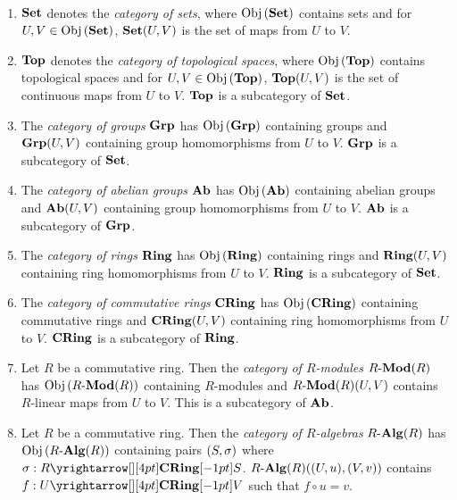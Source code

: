 \begin{eg}~
  \begin{enumerate}
    \item $\mathbf{Set}$ denotes the \emph{category of sets}, where 
    $\mathrm{Obj}\left(\mathbf{Set}\right)$ contains sets and for $U, V \in \mathrm{Obj}\left(\mathbf{Set}\right)$, 
    $\mathbf{Set}(U,V)$ is the set of maps from $U$ to $V$. 
    \item $\mathbf{Top}$ denotes the \emph{category of topological spaces}, where
    $\mathrm{Obj}\left(\mathbf{Top}\right)$ contains topological spaces and for $U, V \in \mathrm{Obj}\left(\mathbf{Top}\right)$, 
    $\mathbf{Top}(U,V)$ is the set of continuous maps from $U$ to $V$. 
    $\mathbf{Top}$ is a subcategory of $\mathbf{Set}$. 
    \item The \emph{category of groups} $\mathbf{Grp}$ has 
    $\mathrm{Obj}\left(\mathbf{Grp}\right)$ containing groups and 
    $\mathbf{Grp}(U,V)$ containing group homomorphisms from $U$ to $V$. 
    $\mathbf{Grp}$ is a subcategory of $\mathbf{Set}$.  
    \item The \emph{category of abelian groups} $\mathbf{Ab}$ has 
    $\mathrm{Obj}\left(\mathbf{Ab}\right)$ containing abelian groups and 
    $\mathbf{Ab}(U,V)$ containing group homomorphisms from $U$ to $V$. 
    $\mathbf{Ab}$ is a subcategory of $\mathbf{Grp}$. 
    \item The \emph{category of rings} $\mathbf{Ring}$ has 
    $\mathrm{Obj}\left(\mathbf{Ring}\right)$ containing rings and 
    $\mathbf{Ring}(U,V)$ containing ring homomorphisms from $U$ to $V$.
    $\mathbf{Ring}$ is a subcategory of $\mathbf{Set}$. 
    \item The \emph{category of commutative rings} $\mathbf{CRing}$ has 
    $\mathrm{Obj}\left(\mathbf{CRing}\right)$ containing commutative rings and 
    $\mathbf{CRing}(U,V)$ containing ring homomorphisms from $U$ to $V$.
    $\mathbf{CRing}$ is a subcategory of $\mathbf{Ring}$. 
    \item Let $R$ be a commutative ring. 
    Then the \emph{category of $R$-modules} $R\text{-}\mathbf{Mod}(R)$ has 
    $\mathrm{Obj}\left(R\text{-}\mathbf{Mod}(R)\right)$ containing $R$-modules and 
    $R\text{-}\mathbf{Mod}(R)(U,V)$ contains $R$-linear maps from $U$ to $V$.
    This is a subcategory of $\mathbf{Ab}$. 
    \item Let $R$ be a commutative ring. 
    Then the \emph{category of $R$-algebras} $R\text{-}\mathbf{Alg}(R)$ has 
    $\mathrm{Obj}\left(R\text{-}\mathbf{Alg}(R)\right)$ containing pairs $(S,\sigma)$ where $\si : \map{R}{S}{\CRING}{}$.
    $R\text{-}\mathbf{Alg}(R)((U,u),(V,v))$ contains $f : \map{U}{V}{\CRING}{}$ such that 
    $f \circ u = v$. 
  \end{enumerate}
\end{eg}

